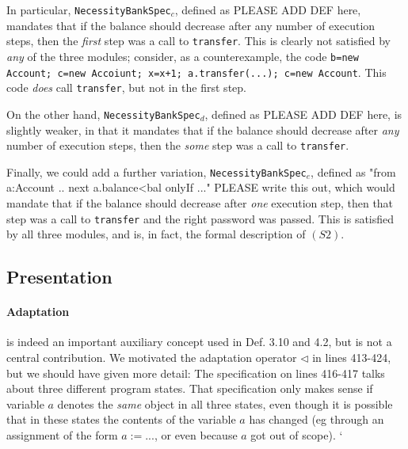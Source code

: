 \documentclass[11pt]{amsart}
\newcommand{\prg}[1]{\texttt{#1}}
\begin{document}
In particular, \prg{NecessityBankSpec}$_c$, defined as PLEASE ADD DEF here, mandates that if the balance should decrease after any number of execution steps, then the \emph{first} step was a call  to \prg{transfer}. This is clearly not satisfied by \emph{any} of the three modules; consider, as a counterexample, the code \prg{b=new Account; c=new Accoiunt; x=x+1; a.transfer(...); c=new Account}. This code \emph{does} call \prg{transfer}, but not in the first step.

On the other hand,   \prg{NecessityBankSpec}$_d$, defined as PLEASE ADD DEF here, is slightly weaker, in that it mandates that if the balance should decrease after \emph{any} number of execution steps, then the \emph{some} step was a call  to \prg{transfer}.  

Finally, we could add a further variation, \prg{NecessityBankSpec}$_e$, defined as "from a:Account .. next a.balance<bal onlyIf ..." PLEASE write this out, which would mandate  that if the balance should decrease after \emph{one} execution step, then that step was a call  to \prg{transfer} and the right password was passed. This is satisfied by all three modules, and is, in fact, the formal description of $(S2)$.

\subsection*{Presentation}

\paragraph{\textbf{Adaptation}} is indeed an important auxiliary concept   used in Def. 3.10 and 4.2, but is not a central contribution. 
We motivated the adaptation operator $\triangleleft$  in lines 413-424, but we should have given more detail:
The specification on lines 416-417 talks about 
three different program states. That specification only makes sense if variable $a$ denotes
the \emph{same} object in all three states, even though it is possible that in these states the contents of the variable 
$a$ has changed (eg through an assignment of the form $a:=...$, or even because $a$ got out of scope).
`%
\end{document}
